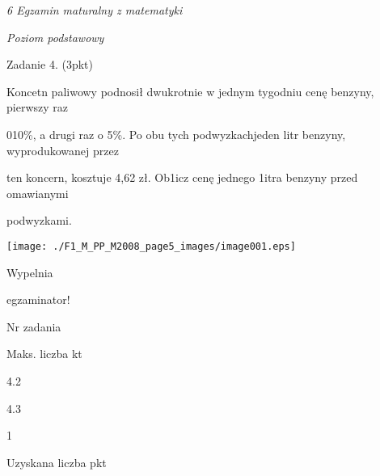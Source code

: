 \documentclass[a4paper,12pt]{article}
\begin{document}
{\it 6 Egzamin maturalny z matematyki}

{\it Poziom podstawowy}

Zadanie 4. (3pkt)

Koncetn paliwowy podnosił dwukrotnie w jednym tygodniu cenę benzyny, pierwszy raz

010\%, a drugi raz o 5\%. Po obu tych podwyzkachjeden litr benzyny, wyprodukowanej przez

ten koncern, kosztuje 4,62 zł. Ob1icz cenę jednego 1itra benzyny przed omawianymi

podwyzkami.
\begin{center}
\texttt{[image: ./F1\_M\_PP\_M2008\_page5\_images/image001.eps]}
\end{center}
Wypelnia

egzaminator!

Nr zadania

Maks. liczba kt

4.2

4.3

1

Uzyskana liczba pkt
\end{document}
